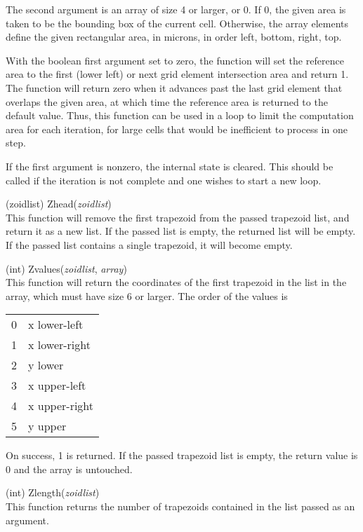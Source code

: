\begin{description}
The second argument is an array of size 4 or larger, or 0.  If 0, the
given area is taken to be the bounding box of the current cell. 
Otherwise, the array elements define the given rectangular area, in
microns, in order left, bottom, right, top.

With the boolean first argument set to zero, the function will set the
reference area to the first (lower left) or next grid element
intersection area and return 1.  The function will return zero when it
advances past the last grid element that overlaps the given area, at
which time the reference area is returned to the default value.  Thus,
this function can be used in a loop to limit the computation area for
each iteration, for large cells that would be inefficient to process
in one step.
 
If the first argument is nonzero, the internal state is cleared.  This
should be called if the iteration is not complete and one wishes to
start a new loop.

\item{(zoidlist) \vt Zhead({\it zoidlist\/})}\\
This function will remove the first trapezoid from the passed
trapezoid list, and return it as a new list.  If the passed list is
empty, the returned list will be empty.  If the passed list contains a
single trapezoid, it will become empty.

\item{(int) \vt Zvalues({\it zoidlist\/}, {\it array\/})}\\
This function will return the coordinates of the first trapezoid in
the list in the array, which must have size 6 or larger.  The order of
the values is

\begin{tabular}{ll}
0 & x lower-left\\
1 & x lower-right\\
2 & y lower\\
3 & x upper-left\\
4 & x upper-right\\
5 & y upper\\
\end{tabular}

On success, 1 is returned.  If the passed trapezoid list is empty,
the return value is 0 and the array is untouched.

\item{(int) \vt Zlength({\it zoidlist\/})}\\
This function returns the number of trapezoids contained in the list
passed as an argument.


\end{description}

